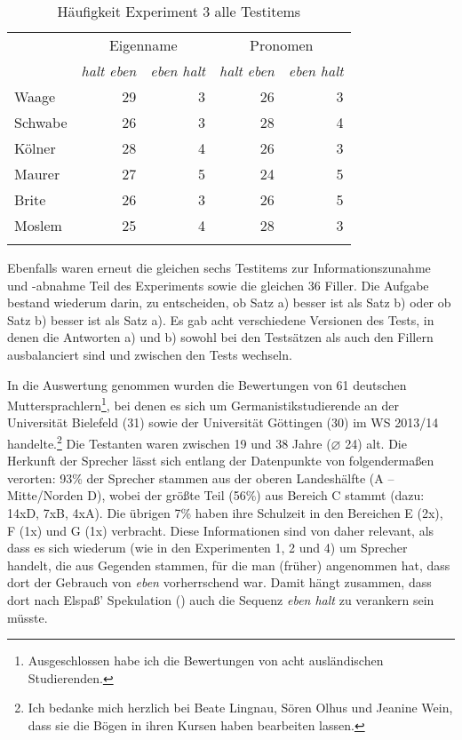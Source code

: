 \begin{table}
	\caption{\label{tab:691}Häufigkeit Experiment 3 alle Testitems}
	\begin{tabular}{lrrrr}
	\lsptoprule
	{} & \multicolumn{2}{c}{{Eigenname}} & \multicolumn{2}{c}{{Pronomen}}\\\cmidrule(lr){2-3}\cmidrule(lr){4-5}
	{} & \textit{halt eben} & \textit{eben halt} & \textit{halt eben} & \textit{eben halt}\\
	\midrule
	Waage & 29 & 3 & 26 & 3\\
	Schwabe & 26 & 3 & 28 & 4\\
	Kölner & 28 & 4 & 26 & 3\\
	Maurer & 27 & 5 & 24 & 5\\
	Brite & 26 & 3 & 26 & 5\\
	Moslem & 25 & 4 & 28 & 3\\\lspbottomrule
    \end{tabular}
\end{table}
Ebenfalls waren erneut die gleichen sechs Testitems zur Informationszunahme und -abnahme Teil des Experiments sowie die gleichen 36 Filler. Die Aufgabe bestand wiederum darin, zu entscheiden, ob Satz a) besser ist als Satz b) oder ob Satz b) besser ist als Satz a). Es gab acht verschiedene Versionen des Tests, in denen die Antworten a) und b) sowohl bei den Testsätzen als auch den Fillern ausbalanciert sind und zwischen den Tests wechseln.

In die Auswertung genommen wurden die Bewertungen von 61 deutschen Muttersprachlern\footnote{Ausgeschlossen habe ich die Bewertungen von acht ausländischen Studierenden.}, bei denen es sich um Germanistikstudierende an der Universität Bielefeld (31) sowie der Universität Göttingen (30) im WS 2013/14 handelte.\footnote{Ich bedanke mich herzlich bei Beate Lingnau, Sören Olhus und Jeanine Wein, dass sie die Bögen in ihren Kursen haben bearbeiten lassen.} Die Testanten waren zwischen 19 und 38 Jahre (⌀ 24) alt. Die Herkunft der Sprecher lässt sich entlang der Datenpunkte von \citet{Eichhoff1978} folgendermaßen verorten: 93\% der Sprecher stammen aus der oberen Landeshälfte (A – Mitte/Norden D), wobei der größte Teil (56\%) aus Bereich C stammt (dazu: 14xD, 7xB, 4xA). Die übrigen 7\% haben ihre Schulzeit in den Bereichen E (2x), F (1x) und G (1x) verbracht. Diese Informationen sind von daher relevant, als dass es sich wiederum (wie in den Experimenten 1, 2 und 4) um Sprecher handelt, die aus Gegenden stammen, für die man (früher) angenommen hat, dass dort der Gebrauch von \textit{eben} vorherrschend war. Damit hängt zusammen, dass dort nach Elspaß' Spekulation (\citeyear[17, Fn 41]{Elspass2005}) auch die Sequenz \textit{eben halt} zu verankern sein müsste.

